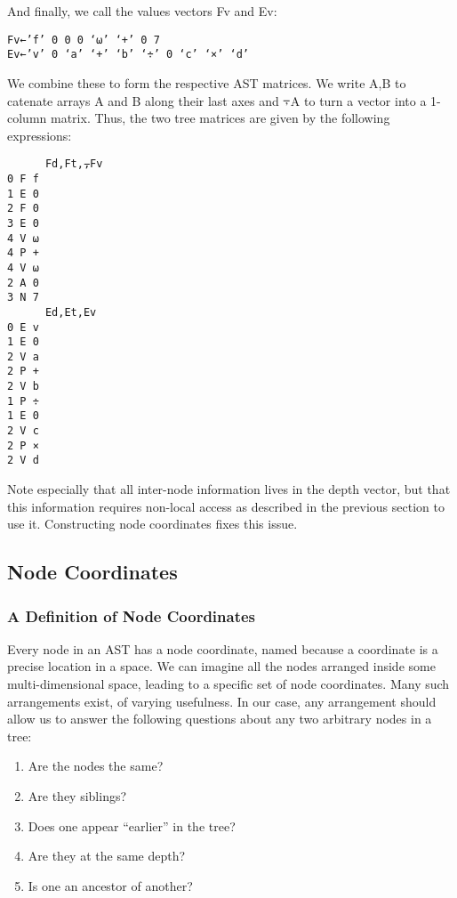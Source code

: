 \documentclass[pldi]{sigplanconf-pldi15}
\begin{document}
And finally, we call the values vectors Fv and Ev:

\begin{verbatim}
Fv←’f’ 0 0 0 ‘⍵’ ‘+’ 0 7
Ev←’v’ 0 ‘a’ ‘+’ ‘b’ ‘÷’ 0 ‘c’ ‘×’ ‘d’
\end{verbatim}

We combine these to form the respective AST matrices. We write A,B to catenate arrays A and B along their 
last axes and ⍪A to turn a vector into a 1-column matrix. Thus, the two tree matrices are given by the 
following expressions:

\begin{verbatim}
      Fd,Ft,⍪Fv
0 F f
1 E 0
2 F 0
3 E 0
4 V ⍵
4 P +
4 V ⍵
2 A 0
3 N 7
      Ed,Et,Ev
0 E v
1 E 0
2 V a
2 P +
2 V b
1 P ÷
1 E 0
2 V c
2 P ×
2 V d
\end{verbatim}

Note especially that all inter-node information lives in the depth vector, but that this information requires 
non-local access as described in the previous section to use it. Constructing node coordinates fixes this issue.
\subsection{Node Coordinates}

\subsubsection{A Definition of Node Coordinates}

Every node in an AST has a node coordinate, named because a coordinate is a precise location in a space. 
We can imagine all the nodes arranged inside some multi-dimensional space, leading to a specific set of 
node coordinates. Many such arrangements exist, of varying usefulness. In our case, any arrangement 
should allow us to answer the following questions about any two arbitrary nodes in a tree:

\begin{enumerate}[noitemsep]
\item Are the nodes the same?
\item Are they siblings?
\item Does one appear “earlier” in the tree?
\item Are they at the same depth?
\item Is one an ancestor of another?
\end{enumerate}
\end{document}
